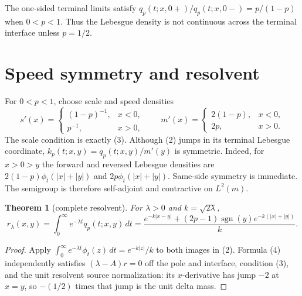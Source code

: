 \documentclass[10pt]{article}
\newtheorem{theorem}{Theorem}
\begin{document}
The one-sided terminal limits satisfy
$q_p(t;x,0+)/q_p(t;x,0-)=p/(1-p)$ when $0<p<1$.  Thus the Lebesgue density is
not continuous across the terminal interface unless $p=1/2$.

\section{Speed symmetry and resolvent}
For $0<p<1$, choose scale and speed densities
\[
s'(x)=\begin{cases}(1-p)^{-1},&x<0,\\p^{-1},&x>0,
\end{cases}\qquad
m'(x)=\begin{cases}2(1-p),&x<0,\\2p,&x>0.
\end{cases}
\]
The scale condition is exactly (3).  Although (2) jumps in its terminal
Lebesgue coordinate, $k_p(t;x,y)=q_p(t;x,y)/m'(y)$ is symmetric.  Indeed, for
$x>0>y$ the forward and reversed Lebesgue densities are
$2(1-p)\phi_t(|x|+|y|)$ and $2p\phi_t(|x|+|y|)$.  Same-side symmetry is
immediate.  The semigroup is therefore self-adjoint and contractive on
$L^2(m)$.

\begin{theorem}[complete resolvent]
For $\lambda>0$ and $k=\sqrt{2\lambda}$,
\begin{equation}
 r_\lambda(x,y)=\int_0^\infty e^{-\lambda t}q_p(t;x,y)\,dt
 =\frac{e^{-k|x-y|}+(2p-1)\operatorname{sgn}(y)
 e^{-k(|x|+|y|)}}{k}.
\end{equation}
\end{theorem}
\begin{proof}
Apply
$\int_0^\infty e^{-\lambda t}\phi_t(z)\,dt=e^{-k|z|}/k$
to both images in (2).  Formula (4) independently satisfies
$(\lambda-A)r=0$ off the pole and interface, condition (3), and the unit
resolvent source normalization: its $x$-derivative has jump $-2$ at $x=y$,
so $-(1/2)$ times that jump is the unit delta mass.
\end{proof}
\end{document}
